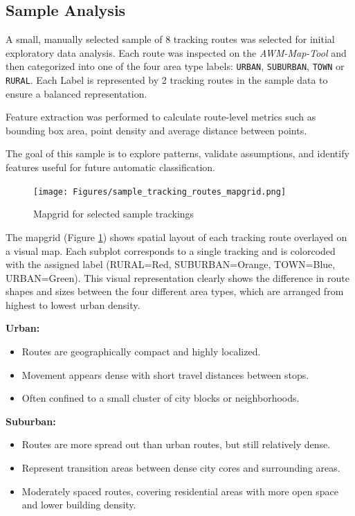 \documentclass[a4paper,12pt,twoside]{scrreprt}
\begin{document}
\subsection{Sample Analysis}

A small, manually selected sample of 8 tracking routes was selected for initial
exploratory data analysis. Each route was inspected on the
\textit{AWM-Map-Tool} and
then categorized into one of the four area type labels: \texttt{URBAN},
\texttt{SUBURBAN}, \texttt{TOWN} or \texttt{RURAL}. Each Label is represented
by 2 tracking routes in the sample data to
ensure a balanced representation.

Feature extraction was performed to calculate route-level metrics such as
bounding box area, point density and average
distance between points.

The goal of this sample is to explore patterns, validate assumptions, and
identify features useful for future automatic classification.

\begin{figure}[htbp]
  \centering

  \texttt{[image: Figures/sample\_tracking\_routes\_mapgrid.png]}
  \caption{Mapgrid for selected sample trackings}
  \label{fig:sample_mapgrid}
\end{figure}
\FloatBarrier
The mapgrid (Figure \ref{fig:sample_mapgrid}) shows spatial layout of each
tracking route overlayed on a visual
map. Each subplot corresponds to a single tracking and is colorcoded with the
assigned label (RURAL=Red, SUBURBAN=Orange, TOWN=Blue, URBAN=Green). This
visual representation clearly shows the difference in route shapes and sizes
between the four different area types, which are arranged from highest to
lowest urban density.

\textbf{Urban:}
\begin{itemize}
  \item Routes are geographically compact and highly localized.
  \item Movement appears dense with short travel distances between stops.
  \item Often confined to a small cluster of city blocks or neighborhoods.
\end{itemize}

\textbf{Suburban:}
\begin{itemize}
  \item Routes are more spread out than urban routes, but still relatively
        dense.
  \item Represent transition areas between dense city cores and surrounding
        areas.
  \item Moderately spaced routes, covering residential areas with more open
        space and lower building density.
\end{itemize}
\end{document}
